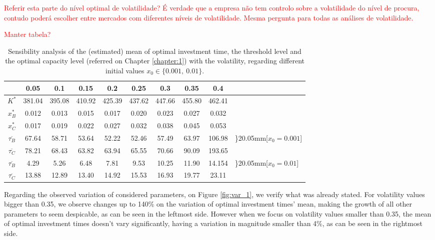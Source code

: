 \textcolor{red}{Referir esta parte do nível optimal de volatilidade? É verdade que a empresa não tem controlo sobre a volatilidade do nível de procura, contudo poderá escolher entre mercados com diferentes níveis de volatilidade. Mesma pergunta para todas as análises de volatilidade.}

\textcolor{red}{Manter tabela?}

\begin{table}[!ht]
	\centering
	\caption{Sensibility analysis of the (estimated) mean of optimal investment time, the threshold level and the optimal capacity level (referred on Chapter \ref{chapter:1}) with the volatility, regarding different initial values $x_0 \in \{0.001, \ 0.01\}$.}
	\begin{tabular}{c|ccccccccl}
		\hline
		\text{ $\sigma $ } & 0.05 & 0.1 & 0.15 & 0.2 & 0.25 & 0.3 & 0.35 & 0.4 \\ \hline
		$K^*$ & 381.04 & 395.08 & 410.92 & 425.39 & 437.62 & 447.66 & 455.80 & 462.41 \\
		$x_B^*$ & 0.012 & 0.013 & 0.015 & 0.017 & 0.020 & 0.023 & 0.027 & 0.032 \\
		$x_C^*$ & 0.017 & 0.019 & 0.022 & 0.027 & 0.032 & 0.038 & 0.045 & 0.053 \\ \hline
	   $\overline{\tau _B}$ & 67.64 & 58.71 & 53.64 & 52.22 & 52.46 & 57.49 & 63.97 & 106.98 & \rdelim\}{2}{0.05mm}[$x_0=0.001$]  \\
		$\overline{\tau _C}$ & 78.21 & 68.43 & 63.82 & 63.94 & 65.55 & 70.66 & 90.09 & 193.65 \\ \hline
		$\overline{\tau _B}$ & 4.29 & 5.26 & 6.48 & 7.81 & 9.53 & 10.25 & 11.90 & 14.154 &	\rdelim\}{2}{0.05mm}[$x_0=0.01$] \\
		$\overline{\tau _C}$ & 13.88 & 12.89 & 13.40 & 14.92 & 15.53 & 16.93 & 19.77 & 23.11
	 \\ \hline
	\end{tabular}
\label{tab:vol_1}
\end{table}


Regarding the observed variation of considered parameters, on Figure \ref{fig:var_1}, we verify what was already stated. 
For volatility values bigger than 0.35, we observe changes up to 140\% on the variation of optimal investment times' mean, making the growth of all other parameters to seem despicable, as can be seen in the leftmost side. 
However when we focus on volatility values smaller than 0.35, the mean of optimal investment times doesn't vary significantly, having a variation in magnitude smaller than 4\%, as can be seen in the rightmost side.




